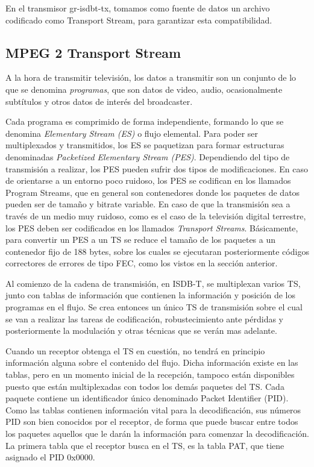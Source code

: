 En el transmisor gr-isdbt-tx, tomamos como fuente de datos un archivo codificado como Transport Stream, para garantizar esta compatibilidad.

	\subsection{MPEG 2 Transport Stream}
	
	A la hora de transmitir televisión, los datos a transmitir son un conjunto de lo que se denomina \textit{programas}, que son datos de video, audio, ocasionalmente subtítulos y otros datos de interés del broadcaster.  
	
	Cada programa es comprimido de forma independiente, formando lo que se denomina \textit{Elementary Stream (\gls{ES})} o flujo elemental. Para poder ser multiplexados y transmitidos, los ES se paquetizan para formar estructuras denominadas \textit{Packetized Elementary Stream (PES)}. Dependiendo del tipo de transmisión a realizar, los PES pueden sufrir dos tipos de modificaciones. En caso de orientarse a un entorno poco ruidoso, los \gls{PES} se codifican en los llamados Program Streams, que en general son contenedores donde los paquetes de datos pueden ser de tamaño y bitrate variable. En caso de que la transmisión sea a través de un medio muy ruidoso, como es el caso de la televisión digital terrestre, los PES deben ser codificados en los llamados \textit{Transport Streams}. Básicamente, para convertir un PES a un \gls{TS} se reduce el tamaño de los paquetes a un contenedor fijo de 188 bytes, sobre los cuales se ejecutaran posteriormente códigos correctores de errores de tipo \gls{FEC}, como los vistos en la sección anterior.
	
	Al comienzo de la cadena de transmisión, en ISDB-T, se multiplexan varios TS, junto con tablas de información que contienen la información y posición de los programas en el flujo. Se crea entonces un único TS de transmisión sobre el cual se van a realizar las tareas de codificación, robustecimiento ante pérdidas y posteriormente la modulación y otras técnicas que se verán mas adelante.
	
	Cuando un receptor obtenga el TS en cuestión, no tendrá en principio información alguna sobre el contenido del flujo. Dicha información existe en las tablas, pero en un momento inicial de la recepción, tampoco están disponibles puesto que están multiplexadas con todos los demás paquetes del TS. Cada paquete contiene un identificador único denominado Packet Identifier (\gls{PID}). Como las tablas contienen información vital para la decodificación, sus números PID son bien conocidos por el receptor, de forma que puede buscar entre todos los paquetes aquellos que le darán la información para comenzar la decodificación. La primera tabla que el receptor busca en el TS, es la tabla \gls{PAT}, que tiene asignado el PID 0x0000. 
	
